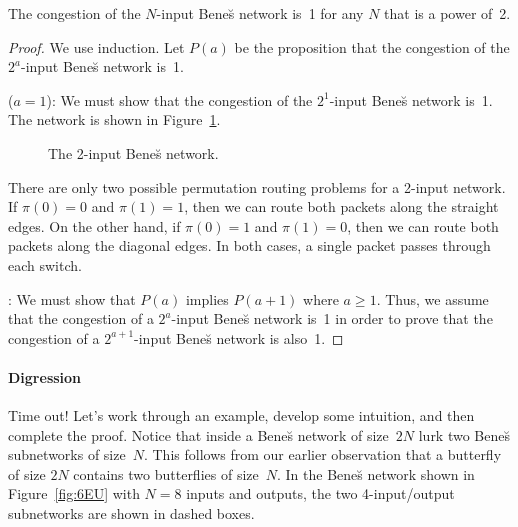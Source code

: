 \begin{theorem}\label{thm:benes_congestion}
The congestion of the $N$-input Bene\u{s} network is~1 for any $N$
that is a power of~2.
\end{theorem}

\begin{proof}
We use induction.  Let $P(a)$ be the proposition that the congestion of
the $2^a$-input Bene\u{s} network is~1.

 ($a = 1$): We must show that the congestion
of the $2^1$-input Bene\u{s} network is~1.  The network is shown in
Figure~\ref{fig:6ET}.

\begin{figure}

\missinggraphic

\caption{The 2-input Bene\u{s} network.}

\label{fig:6ET}

\end{figure}

There are only two possible permutation routing problems for a 2-input
network.  If $\pi(0) = 0$ and $\pi(1) = 1$, then we can route both
packets along the straight edges.  On the other hand, if $\pi(0) = 1$
and $\pi(1) = 0$, then we can route both packets along the diagonal
edges.  In both cases, a single packet passes through each switch.

: We must show that $P(a)$ implies $P(a
+ 1)$ where $a \ge 1$.  Thus, we assume that the congestion of a
$2^a$-input Bene\u{s} network is~1 in order to prove that the
congestion of a $2^{a + 1}$-input Bene\u{s} network is also~1.

\noqed

\end{proof}

\paragraph{Digression}

Time out!  Let's work through an example, develop some intuition, and
then complete the proof.  Notice that inside a Bene\u{s} network of
size~$2N$ lurk two Bene\u{s} subnetworks of size~$N$.  This follows
from our earlier observation that a butterfly of size $2N$ contains
two butterflies of size~$N$.  In the Bene\u{s} network shown in
Figure~\ref{fig:6EU} with $N=8$ inputs and outputs, the two
4-input/output subnetworks are shown in dashed boxes.

